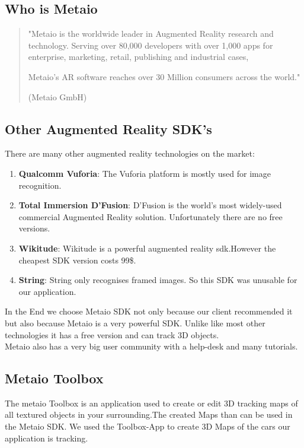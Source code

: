 \subsection{Who is Metaio}
\begin{quotation}
"Metaio is the worldwide leader in Augmented Reality research and technology. Serving over 80,000 developers with over 1,000 apps for enterprise, marketing, retail, publishing and industrial cases,
 
 
Metaio's AR software reaches over 30 Million consumers across the world." 
\begin{flushright}
(Metaio GmbH)
\end{flushright}
\end{quotation}

\subsection{Other Augmented Reality SDK's}
There are many other augmented reality technologies on the market: 
\begin{enumerate}
\item \textbf{Qualcomm Vuforia}: The Vuforia platform is mostly used for image recognition.

\item \textbf{Total Immersion D'Fusion}:
D'Fusion is the world's most widely-used commercial Augmented Reality solution. Unfortunately there are no free versions.

\item \textbf{Wikitude}: Wikitude is a powerful augmented reality sdk.However the cheapest SDK version costs 99\$.

\item \textbf{String}: String only recognises framed images. So this SDK was unusable for our application.  
\end{enumerate} \cite{augmentedRealitySDk}

In the End we choose Metaio SDK not only because our client recommended it but also because Metaio is a very powerful SDK. Unlike like most other technologies it has a free version and can track 3D objects. 
\\



Metaio also has a very big user community with a help-desk and many tutorials.   
 
\subsection{Metaio Toolbox}
The metaio Toolbox is an application used to create or edit 3D tracking maps of all textured objects in your surrounding.The created Maps than can be used in the Metaio SDK. We used the Toolbox-App to create 3D Maps of the cars our application is tracking.
\\ 

